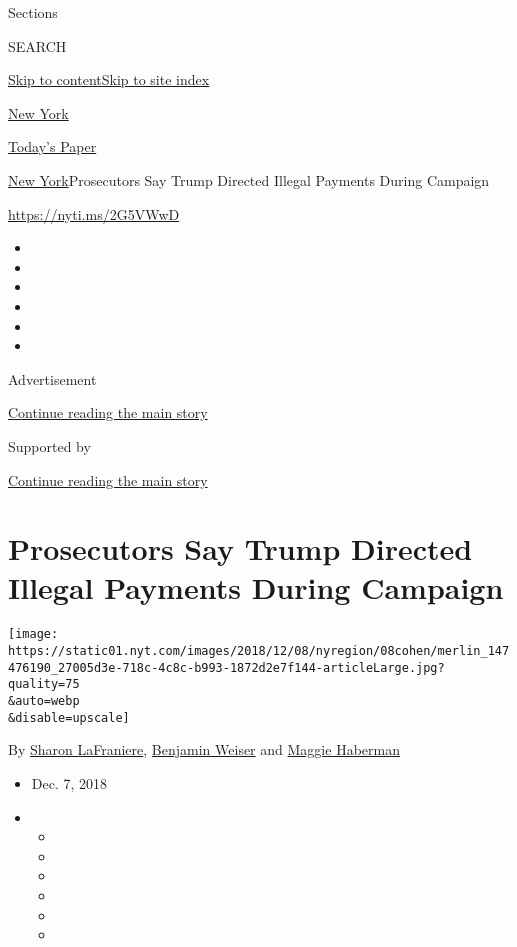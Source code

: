 Sections

SEARCH

\protect\hyperlink{site-content}{Skip to
content}\protect\hyperlink{site-index}{Skip to site index}

\href{https://www.nytimes.com/section/nyregion}{New York}

\href{https://myaccount.nytimes.com/auth/login?response_type=cookie\&client_id=vi}{}

\href{https://www.nytimes.com/section/todayspaper}{Today's Paper}

\href{/section/nyregion}{New York}\textbar{}Prosecutors Say Trump
Directed Illegal Payments During Campaign

\url{https://nyti.ms/2G5VWwD}

\begin{itemize}
\item
\item
\item
\item
\item
\item
\end{itemize}

Advertisement

\protect\hyperlink{after-top}{Continue reading the main story}

Supported by

\protect\hyperlink{after-sponsor}{Continue reading the main story}

\hypertarget{prosecutors-say-trump-directed-illegal-payments-during-campaign}{%
\section{Prosecutors Say Trump Directed Illegal Payments During
Campaign}\label{prosecutors-say-trump-directed-illegal-payments-during-campaign}}

\texttt{[image: https://static01.nyt.com/images/2018/12/08/nyregion/08cohen/merlin\_147476190\_27005d3e-718c-4c8c-b993-1872d2e7f144-articleLarge.jpg?quality=75\\\&auto=webp\\\&disable=upscale]}

By \href{https://www.nytimes.com/by/sharon-lafraniere}{Sharon
LaFraniere}, \href{https://www.nytimes.com/by/benjamin-weiser}{Benjamin
Weiser} and \href{https://www.nytimes.com/by/maggie-haberman}{Maggie
Haberman}

\begin{itemize}
\item
  Dec. 7, 2018
\item
  \begin{itemize}
  \item
  \item
  \item
  \item
  \item
  \item
  \end{itemize}
\end{itemize}

